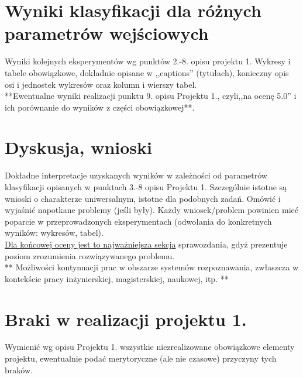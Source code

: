 \documentclass{classrep}
\begin{document}
\section{Wyniki klasyfikacji dla różnych parametrów wejściowych}
Wyniki kolejnych eksperymentów wg punktów 2.-8. opisu projektu 1.  Wykresy i tabele
obowiązkowe, dokładnie opisane w ,,captions'' (tytułach), konieczny opis osi i
jednostek wykresów oraz kolumn i wierszy tabel.\\ 

{**Ewentualne wyniki realizacji punktu 9. opisu Projektu 1., czyli,,na ocenę 5.0'' i ich porównanie do wyników z
części obowiązkowej**.}\\



\section{Dyskusja, wnioski}
Dokładne interpretacje uzyskanych wyników w zależności od parametrów klasyfikacji
opisanych w punktach 3.-8 opisu Projektu 1. 
Szczególnie istotne są wnioski o charakterze uniwersalnym, istotne dla podobnych zadań. 
Omówić i wyjaśnić napotkane problemy (jeśli były). Każdy wniosek/problem powinien mieć poparcie
w przeprowadzonych eksperymentach (odwołania do konkretnych wyników: wykresów,
tabel). \\
\underline{Dla końcowej oceny jest to najważniejsza sekcja} sprawozdania, gdyż prezentuje poziom
zrozumienia rozwiązywanego problemu.\\

** Możliwości kontynuacji prac w obszarze systemów rozpoznawania, zwłaszcza w kontekście pracy inżynierskiej,
magisterskiej, naukowej, itp. **\\



\section{Braki w realizacji projektu 1.}
Wymienić wg opisu Projektu 1. wszystkie niezrealizowane obowiązkowe elementy projektu, ewentualnie
podać merytoryczne (ale nie czasowe) przyczyny tych braków. 
\end{document}
